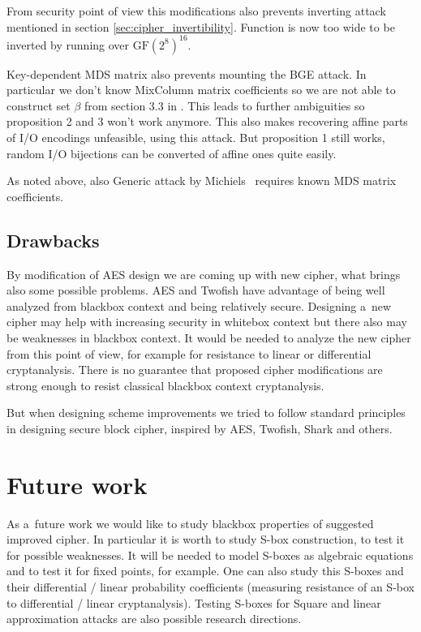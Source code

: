\documentclass[11pt,oneside,final]{fithesis2}
\newcommand{\gfe}{\ensuremath{\text{GF}\left(2^8\right)}}
\begin{document}
    From security point of view this modifications also prevents inverting attack mentioned in section \ref{sec:cipher_invertibility}. Function is now too wide to be
    inverted by running over $\gfe^{16}$. 
    
    Key-dependent MDS matrix also prevents mounting the BGE attack. In particular we don't know MixColumn matrix coefficients so we are not able to construct set $\beta$
    from section 3.3 in \cite{Billet:2004:CWB:2080787.2080809}. This leads to further ambiguities so proposition 2 and 3 won't work anymore. This also makes recovering 
    affine parts of I/O encodings unfeasible, using this attack. But proposition 1 still works, random I/O bijections can be converted of affine ones quite easily.

    As noted above, also  Generic attack by Michiels~\citep{Michiels:2007:MST:1314276.1314291} requires known MDS matrix coefficients.
    
    \section{Drawbacks}
    By modification of AES design we are coming up with new cipher, what brings also some possible problems. AES and Twofish have advantage of being well analyzed from blackbox 
    context and being relatively secure. Designing a~new cipher may help with increasing security in whitebox context but there also may be weaknesses in blackbox context. 
    It would be needed to analyze the new cipher from this point of view, for example for resistance to linear or differential cryptanalysis. There is no guarantee that 
    proposed cipher modifications are strong enough to resist classical blackbox context cryptanalysis.
    
    But when designing scheme improvements we tried to follow standard principles in designing secure block cipher, inspired by AES, Twofish, Shark and others.
    
    
\chapter{Future work}\label{sec:futurework}
    As a~future work we would like to study blackbox properties of suggested improved cipher. In particular it is worth to study S-box construction, to test
    it for possible weaknesses. It will be needed to model S-boxes as algebraic equations and to test it for fixed points, for example. One can also study this S-boxes
    and their differential / linear probability coefficients (measuring resistance of an S-box to differential / linear cryptanalysis). Testing S-boxes 
    for Square and linear approximation attacks are also possible research directions.
    
\end{document}
